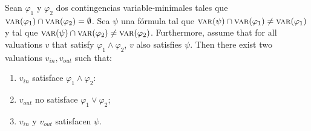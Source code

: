 \begin{theorem}\label{theorem:TeoremaPrincipal}
Sean $\varphi_1$ y $\varphi_2$ dos contingencias variable-minimales tales que $\textsc{var}(\varphi_1)\cap \textsc{var}(\varphi_2) = \emptyset$. Sea $\psi$ una fórmula tal que $\textsc{var}(\psi) \cap \textsc{var}(\varphi_1) \neq \textsc{var}(\varphi_1)$ y tal que $\textsc{var}(\psi) \cap \textsc{var}(\varphi_2) \neq \textsc{var}(\varphi_2)$.  Furthermore, assume that for all valuations $v$ that satisfy $\varphi_1 \land \varphi_2$, $v$ also satisfies $\psi$. Then there exist two valuations $v_{in}, v_{out}$ such that:
\begin{enumerate}
    \item \label{item:v1EnInterseccion} $v_{in}$ satisface $\varphi_1 \land \varphi_2$:    
    \item $v_{out}$ no satisface $\varphi_1 \lor \varphi_2$; 
    
    \item $v_{in}$ y $v_{out}$ satisfacen $\psi$.
\end{enumerate}
\end{theorem}
